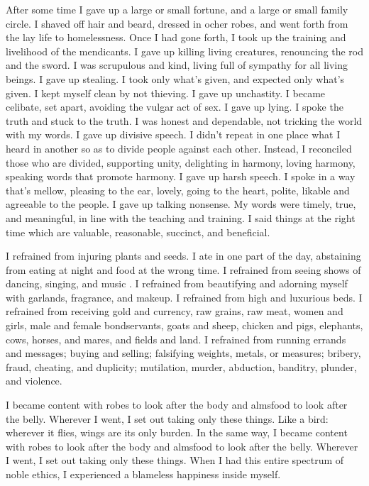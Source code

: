 \documentclass[12pt,openany]{book}%
\begin{document}
After some time I gave up a large or small fortune, and a large or small family circle. I shaved off hair and beard, dressed in ocher robes, and went forth from the lay life to homelessness. Once I had gone forth, I took up the training and livelihood of the mendicants. I gave up killing living creatures, renouncing the rod and the sword. I was scrupulous and kind, living full of sympathy for all living beings. I gave up stealing. I took only what’s given, and expected only what’s given. I kept myself clean by not thieving. I gave up unchastity. I became celibate, set apart, avoiding the vulgar act of sex. I gave up lying. I spoke the truth and stuck to the truth. I was honest and dependable, not tricking the world with my words. I gave up divisive speech. I didn’t repeat in one place what I heard in another so as to divide people against each other. Instead, I reconciled those who are divided, supporting unity, delighting in harmony, loving harmony, speaking words that promote harmony. I gave up harsh speech. I spoke in a way that’s mellow, pleasing to the ear, lovely, going to the heart, polite, likable and agreeable to the people. I gave up talking nonsense. My words were timely, true, and meaningful, in line with the teaching and training. I said things at the right time which are valuable, reasonable, succinct, and beneficial. 

I refrained from injuring plants and seeds. I ate in one part of the day, abstaining from eating at night and food at the wrong time. I refrained from seeing shows of dancing, singing, and music . I refrained from beautifying and adorning myself with garlands, fragrance, and makeup. I refrained from high and luxurious beds. I refrained from receiving gold and currency, raw grains, raw meat, women and girls, male and female bondservants, goats and sheep, chicken and pigs, elephants, cows, horses, and mares, and fields and land. I refrained from running errands and messages; buying and selling; falsifying weights, metals, or measures; bribery, fraud, cheating, and duplicity; mutilation, murder, abduction, banditry, plunder, and violence. 

I became content with robes to look after the body and almsfood to look after the belly. Wherever I went, I set out taking only these things. Like a bird: wherever it flies, wings are its only burden. In the same way, I became content with robes to look after the body and almsfood to look after the belly. Wherever I went, I set out taking only these things. When I had this entire spectrum of noble ethics, I experienced a blameless happiness inside myself. 
\end{document}
